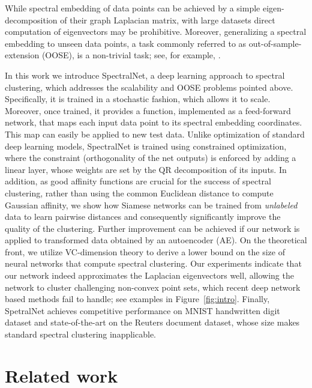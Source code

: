 \documentclass{article} %
\begin{document}
While spectral embedding of data points can be achieved by a simple eigen-decomposition of their graph Laplacian matrix, with large datasets direct computation of eigenvectors may be prohibitive. Moreover, generalizing a spectral embedding to unseen data points, a task commonly referred to as out-of-sample-extension (OOSE), is a non-trivial task; see, for example, \citep{bengio2004out,fowlkes2004spectral,coifman2006geometric}.

In this work we introduce SpectralNet, a deep learning approach to spectral clustering, which addresses the scalability and OOSE problems pointed above.
Specifically, it is trained in a stochastic fashion, which allows it to scale. Moreover, once trained, it provides a function, implemented as a feed-forward network, that maps each input data point to its spectral embedding coordinates. This map can easily be applied to new test data.
Unlike optimization of standard deep learning models, SpectralNet is trained using constrained optimization, where the constraint (orthogonality of the net outputs) is enforced by adding a linear layer, whose weights are set by the QR decomposition of its inputs.
In addition, as good affinity functions are crucial for the success of spectral clustering, rather than using the common Euclidean distance to compute Gaussian affinity, we show how Siamese networks can be trained from \textit{unlabeled} data to learn pairwise distances and consequently significantly improve the quality of the clustering.
Further improvement can be achieved if our network is applied to transformed data obtained by an autoencoder (AE).
On the theoretical front, we utilize VC-dimension theory to derive a lower bound on the size of neural networks that compute spectral clustering. Our experiments indicate that our network indeed approximates the Laplacian eigenvectors well, allowing the network to cluster challenging non-convex point sets, which recent deep network based methods fail to handle; see examples in Figure~\ref{fig:intro}.
Finally, SpetralNet achieves competitive performance on MNIST handwritten digit dataset and state-of-the-art on the Reuters document dataset, whose size makes standard spectral clustering inapplicable.




\section {Related work}\label{sec:related}
\end{document}
